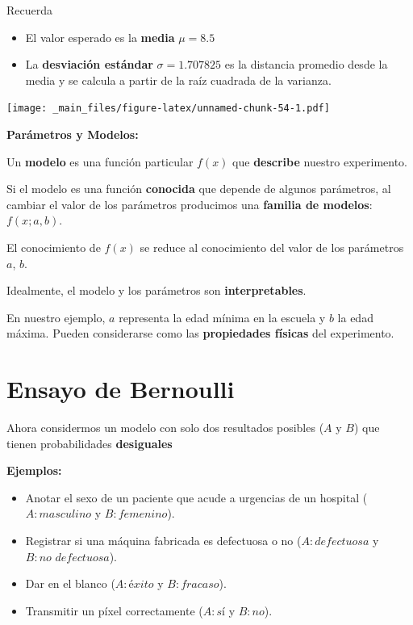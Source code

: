 \documentclass[
]{book}
\begin{document}
Recuerda

\begin{itemize}
\item
  El valor esperado es la \textbf{media} \(\mu=8.5\)
\item
  La \textbf{desviación estándar} \(\sigma=1.707825\) es la distancia promedio desde la media y se calcula a partir de la raíz cuadrada de la varianza.
\end{itemize}

\texttt{[image: \_main\_files/figure-latex/unnamed-chunk-54-1.pdf]}

\textbf{Parámetros y Modelos:}

Un \textbf{modelo} es una función particular \(f(x)\) que \textbf{describe} nuestro experimento.

Si el modelo es una función \textbf{conocida} que depende de algunos parámetros, al cambiar el valor de los parámetros producimos una \textbf{familia de modelos}: \(f(x; a,b)\).

El conocimiento de \(f(x)\) se reduce al conocimiento del valor de los parámetros \(a\), \(b\).

Idealmente, el modelo y los parámetros son \textbf{interpretables}.

En nuestro ejemplo, \(a\) representa la edad mínima en la escuela y \(b\) la edad máxima. Pueden considerarse como las \textbf{propiedades físicas} del experimento.

\hypertarget{ensayo-de-bernoulli}{%
\section{Ensayo de Bernoulli}\label{ensayo-de-bernoulli}}

Ahora considermos un modelo con solo dos resultados posibles (\(A\) y \(B\)) que tienen probabilidades \textbf{desiguales}

\textbf{Ejemplos:}

\begin{itemize}
\item
  Anotar el sexo de un paciente que acude a urgencias de un hospital (\(A:masculino\) y \(B:femenino\)).
\item
  Registrar si una máquina fabricada es defectuosa o no (\(A:defectuosa\) y \(B:no\,\,defectuosa\)).
\item
  Dar en el blanco (\(A:éxito\) y \(B:fracaso\)).
\item
  Transmitir un píxel correctamente (\(A:sí\) y \(B:no\)).
\end{itemize}
\end{document}
